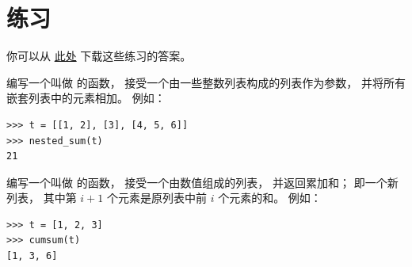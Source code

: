 \section{练习}


你可以从 \href{http://thinkpython2.com/code/list_exercises.py}{此处} 下载这些练习的答案。

\begin{exercise}


编写一个叫做 {\em {}} 的函数， 接受一个由一些整数列表构成的列表作为参数， 并将所有嵌套列表中的元素相加。  例如：

\begin{em}
\begin{lstlisting}
>>> t = [[1, 2], [3], [4, 5, 6]]
>>> nested_sum(t)
21
\end{lstlisting}
\end{em}

\end{exercise}

\begin{exercise}
\label{cumulative}


编写一个叫做 {\em {}} 的函数， 接受一个由数值组成的列表， 并返回累加和；
即一个新列表， 其中第 $i+1$ 个元素是原列表中前 $i$ 个元素的和。
例如：

\begin{em}
\begin{lstlisting}
>>> t = [1, 2, 3]
>>> cumsum(t)
[1, 3, 6]
\end{lstlisting}
\end{em}

\end{exercise}

